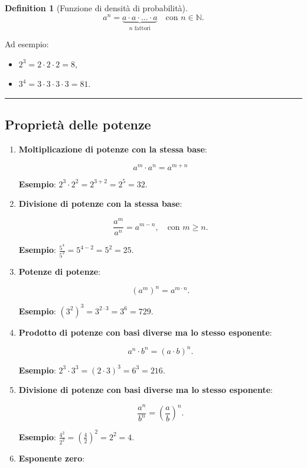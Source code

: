 \documentclass[
  letterpaper,
  DIV=11,
  numbers=noendperiod,
  oneside]{scrreprt}
\providecommand{\tightlist}{%
  \setlength{\itemsep}{0pt}\setlength{\parskip}{0pt}}
\theoremstyle{definition}
\theoremstyle{plain}
\theoremstyle{definition}
\newtheorem{definition}{Definition}[chapter]
\theoremstyle{remark}
\begin{document}
\begin{definition}[Funzione di densità di
probabilità]
\[
a^n = \underbrace{a \cdot a \cdot \dots \cdot a}_{n \text{ fattori}} \quad \text{con } n \in \mathbb{N}.
\]

Ad esempio:

\begin{itemize}
\tightlist
\item
  \(2^3 = 2 \cdot 2 \cdot 2 = 8\),
\item
  \(3^4 = 3 \cdot 3 \cdot 3 \cdot 3 = 81\).
\end{itemize}

\begin{center}\rule{0.5\linewidth}{0.5pt}\end{center}

\subsection{Proprietà delle potenze}\label{proprietuxe0-delle-potenze}

\begin{enumerate}
\def\labelenumi{\arabic{enumi}.}
\item
  \textbf{Moltiplicazione di potenze con la stessa base}:

  \[
  a^m \cdot a^n = a^{m+n}
  \]

  \textbf{Esempio}: \(2^3 \cdot 2^2 = 2^{3+2} = 2^5 = 32\).
\item
  \textbf{Divisione di potenze con la stessa base}:

  \[
  \frac{a^m}{a^n} = a^{m-n}, \quad \text{con } m \geq n.
  \]

  \textbf{Esempio}: \(\frac{5^4}{5^2} = 5^{4-2} = 5^2 = 25\).
\item
  \textbf{Potenze di potenze}:

  \[
  (a^m)^n = a^{m \cdot n}.
  \]

  \textbf{Esempio}: \((3^2)^3 = 3^{2 \cdot 3} = 3^6 = 729\).
\item
  \textbf{Prodotto di potenze con basi diverse ma lo stesso esponente}:

  \[
  a^n \cdot b^n = (a \cdot b)^n.
  \]

  \textbf{Esempio}: \(2^3 \cdot 3^3 = (2 \cdot 3)^3 = 6^3 = 216\).
\item
  \textbf{Divisione di potenze con basi diverse ma lo stesso esponente}:

  \[
  \frac{a^n}{b^n} = \left(\frac{a}{b}\right)^n.
  \]

  \textbf{Esempio}:
  \(\frac{4^2}{2^2} = \left(\frac{4}{2}\right)^2 = 2^2 = 4\).
\item
  \textbf{Esponente zero}:


\end{enumerate}
\end{definition}
\end{document}

